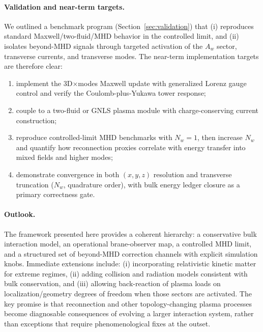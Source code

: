 \documentclass[11pt]{article}
\begin{document}
\paragraph{Validation and near-term targets.}
We outlined a benchmark program (Section~\ref{sec:validation}) that (i) reproduces standard
Maxwell/two-fluid/MHD behavior in the controlled limit, and (ii) isolates beyond-MHD signals
through targeted activation of the \(A_w\) sector, transverse currents, and transverse modes.
The near-term implementation targets are therefore clear:
\begin{enumerate}[leftmargin=1.6em]
\item implement the 3D\(\times\)modes Maxwell update with generalized Lorenz gauge control and
verify the Coulomb-plus-Yukawa tower response;
\item couple to a two-fluid or GNLS plasma module with charge-conserving current construction;
\item reproduce controlled-limit MHD benchmarks with \(N_w=1\), then increase \(N_w\) and quantify
how reconnection proxies correlate with energy transfer into mixed fields and higher modes;
\item demonstrate convergence in both \((x,y,z)\) resolution and transverse truncation (\(N_w\),
quadrature order), with bulk energy ledger closure as a primary correctness gate.
\end{enumerate}

\paragraph{Outlook.}
The framework presented here provides a coherent hierarchy: a conservative bulk interaction
model, an operational brane-observer map, a controlled MHD limit, and a structured set of
beyond-MHD correction channels with explicit simulation knobs. Immediate extensions include:
(i) incorporating relativistic kinetic matter for extreme regimes, (ii) adding collision and
radiation models consistent with bulk conservation, and (iii) allowing back-reaction of plasma
loads on localization/geometry degrees of freedom when those sectors are activated. The key
promise is that reconnection and other topology-changing plasma processes become diagnosable
consequences of evolving a larger interaction system, rather than exceptions that require
phenomenological fixes at the outset.
\end{document}

